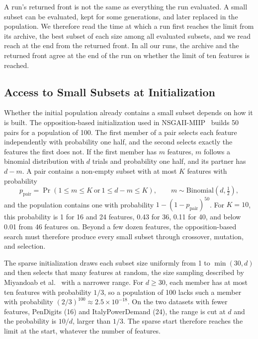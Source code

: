 A run's returned front is not the same as everything the run evaluated. A small subset can be evaluated, kept for some generations, and later replaced in the population. We therefore read the time at which a run first reaches the limit from its archive, the best subset of each size among all evaluated subsets, and we read reach at the end from the returned front. In all our runs, the archive and the returned front agree at the end of the run on whether the limit of ten features is reached.

\subsection{Access to Small Subsets at Initialization}
\label{sec:access}

Whether the initial population already contains a small subset depends on how it is built. The opposition-based initialization used in NSGAII-MIIP~\cite{Li2025} builds 50 pairs for a population of 100. The first member of a pair selects each feature independently with probability one half, and the second selects exactly the features the first does not. If the first member has $m$ features, $m$ follows a binomial distribution with $d$ trials and probability one half, and its partner has $d - m$. A pair contains a non-empty subset with at most $K$ features with probability
\begin{equation}
  p_{\mathrm{pair}} = \Pr\left(1 \leq m \leq K \ \text{or}\ 1 \leq d - m \leq K\right),
  \qquad m \sim \mathrm{Binomial}(d, \tfrac{1}{2}),
  \label{eq:pair}
\end{equation}
and the population contains one with probability $1 - (1 - p_{\mathrm{pair}})^{50}$. For $K = 10$, this probability is 1 for 16 and 24 features, 0.43 for 36, 0.11 for 40, and below 0.01 from 46 features on. Beyond a few dozen features, the opposition-based search must therefore produce every small subset through crossover, mutation, and selection.

The sparse initialization draws each subset size uniformly from 1 to $\min(30, d)$ and then selects that many features at random, the size sampling described by Miyandoab et al.~\cite{Miyandoab2024} with a narrower range. For $d \geq 30$, each member has at most ten features with probability $1/3$, so a population of 100 lacks such a member with probability $(2/3)^{100} \approx 2.5 \times 10^{-18}$. On the two datasets with fewer features, PenDigits (16) and ItalyPowerDemand (24), the range is cut at $d$ and the probability is $10/d$, larger than $1/3$. The sparse start therefore reaches the limit at the start, whatever the number of features.

